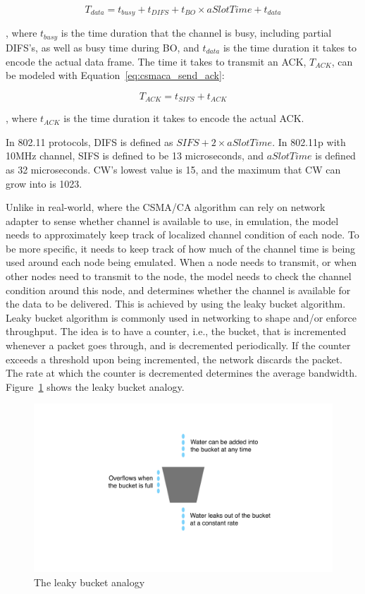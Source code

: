 \documentclass[12pt]{report}
\begin{document}
\begin{equation}
  T_{data}=t_{busy}+t_{DIFS}+t_{BO}\times aSlotTime+t_{data}
  \label{eq:csmaca_send_data}
\end{equation}

, where $t_{busy}$ is the time duration that the channel is busy, including partial DIFS's, as well as busy time during BO, and $t_{data}$ is the time duration it takes to encode the actual data frame. The time it takes to transmit an ACK, $T_{ACK}$, can be modeled with Equation~\ref{eq:csmaca_send_ack}:

\begin{equation}
  T_{ACK}=t_{SIFS}+t_{ACK}
  \label{eq:csmaca_send_ack}
\end{equation}

, where $t_{ACK}$ is the time duration it takes to encode the actual ACK.

In 802.11 protocols, DIFS is defined as $SIFS + 2 \times aSlotTime$. In 802.11p with 10MHz channel, SIFS is defined to be 13 microseconds, and $aSlotTime$ is defined as 32 microseconds. CW's lowest value is 15, and the maximum that CW can grow into is 1023. \cite{ieee201280211macphy}

Unlike in real-world, where the CSMA/CA algorithm can rely on network adapter to sense whether channel is available to use, in emulation, the model needs to approximately keep track of localized channel condition of each node. To be more specific, it needs to keep track of how much of the channel time is being used around each node being emulated. When a node needs to transmit, or when other nodes need to transmit to the node, the model needs to check the channel condition around this node, and determines whether the channel is available for the data to be delivered. This is achieved by using the leaky bucket algorithm. Leaky bucket algorithm \cite{turner1986,yin1991} is commonly used in networking to shape and/or enforce throughput. The idea is to have a counter, i.e., the bucket, that is incremented whenever a packet goes through, and is decremented periodically. If the counter exceeds a threshold upon being incremented, the network discards the packet. The rate at which the counter is decremented determines the average bandwidth. Figure~\ref{fig:leaky_bucket} shows the leaky bucket analogy.

\begin{figure}[h]
  \begin{center}
    \includegraphics[width=.6\textwidth]{figures/leakyBucket.pdf}
    \caption{\label{fig:leaky_bucket}The leaky bucket analogy}
  \end{center}
\end{figure}
\end{document}

